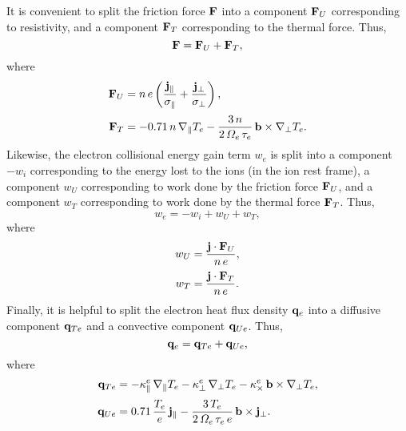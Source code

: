 \documentclass[notitlepage,12pt]{article}
\begin{document}
 It is convenient to split the friction force
${\bf F}$ into a component ${\bf F}_U$ corresponding to resistivity, and a
component ${\bf F}_T$ corresponding to the thermal force. Thus,
\begin{equation}
{\bf F} = {\bf F}_U+{\bf F}_T,
\end{equation}
where
\begin{align}
{\bf F}_U&= n\,e\left(\frac{{\bf j}_\parallel}{\sigma_\parallel}
+\frac{{\bf j}_\perp}{\sigma_\perp}\right), \\[0.5ex]
{\bf F}_T &= - 0.71\,n\,\nabla_\parallel T_e
-\frac{3\,n}{2\,{\mit\Omega}_e\,\tau_e}\,{\bf b}\times\nabla_\perp T_e.
\end{align}
Likewise, the electron collisional energy gain term $w_e$ is split
into a component $-w_i$ corresponding to the energy lost to the ions (in the
ion rest frame), a component $w_U$ corresponding to work done by the friction
force ${\bf F}_U$, and a component $w_T$ corresponding to work done by the
thermal force ${\bf F}_T$. Thus,
\begin{equation}
w_e = -w_i + w_U + w_T,
\end{equation}
where
\begin{align}
w_U &= \frac{{\bf j}\cdot{\bf F}_U}{n\,e},\\[0.5ex]
w_T&= \frac{{\bf j}\cdot{\bf F}_T}{n\,e}.
\end{align}
Finally, it is helpful to split the electron heat flux density ${\bf q}_e$ into
a diffusive component ${\bf q}_{Te}$ and a convective component ${\bf q}_{Ue}$. 
Thus,
\begin{equation}
{\bf q}_e = {\bf q}_{Te} + {\bf q}_{Ue},
\end{equation}
where
\begin{align}
{\bf q}_{Te} &=-\kappa_\parallel^e\,\nabla_\parallel T_e -\kappa_\perp^e\,
\nabla_\perp T_e
-\kappa_\times^e\,{\bf b}\times\nabla_\perp T_e,\\[0.5ex]
{\bf q}_{Ue}&=  0.71\,\frac{T_e}{e}\,{\bf j}_\parallel-
\frac{3\,T_e}{2\,{\mit\Omega}_e\,\tau_e\,e}\,{\bf b}\times{\bf j}_\perp.
\end{align}
\end{document}
